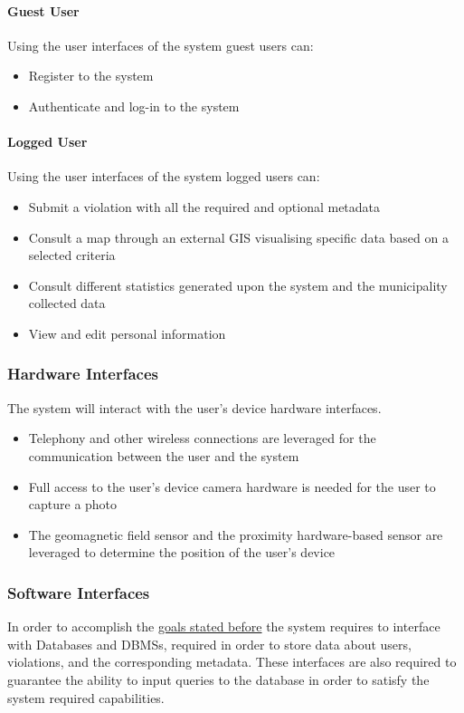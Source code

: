 \paragraph{Guest User}
	Using the user interfaces of the system guest users can:
	\begin{itemize}
		\item Register to the system
		\item Authenticate and log-in to the system
	\end{itemize}
	
\paragraph{Logged User}
	Using the user interfaces of the system logged users can:
	\begin{itemize}
		\item Submit a violation with all the required and optional metadata
		\item Consult a map through an external GIS visualising specific data based on a selected criteria
		\item Consult different statistics generated upon the system and the municipality collected data
		\item View and edit personal information
	\end{itemize}
		
\subsubsection{Hardware Interfaces}
	The system will interact with the user's device hardware interfaces.	
	\begin{itemize} 
		\item Telephony and other wireless connections are leveraged for the communication between the user and the system
		\item Full access to the user's device camera hardware is needed for the user to capture a photo
		\item The geomagnetic field sensor and the proximity hardware-based sensor are leveraged to determine the position of the user's device
	\end{itemize}

\subsubsection{Software Interfaces}
	In order to accomplish the \hyperref[sec:goals]{goals stated before} the system requires to interface with Databases and DBMSs, required in order to store data about users, violations, and the corresponding metadata. These interfaces are also required to guarantee the ability to input queries to the database in order to satisfy the system required capabilities.
	
